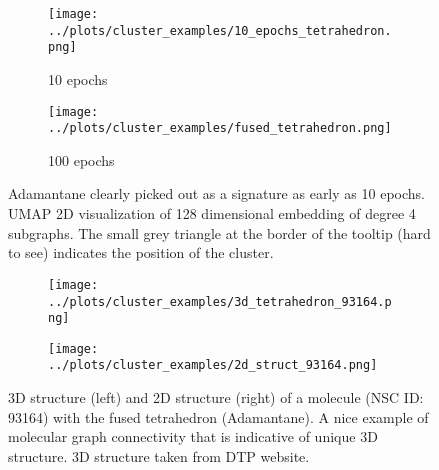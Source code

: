 \begin{figure}
\centering
\begin{subfigure}{0.45\textwidth}
    \texttt{[image: ../plots/cluster\_examples/10\_epochs\_tetrahedron.png]}
    \caption{10 epochs}
\end{subfigure}
\begin{subfigure}{0.45\textwidth}
    \texttt{[image: ../plots/cluster\_examples/fused\_tetrahedron.png]}
    \caption{100 epochs}
\end{subfigure}
\caption{Adamantane clearly picked out as a signature as early as 10 epochs. UMAP 2D visualization of 128 dimensional embedding of degree 4 subgraphs. The small grey triangle at the border of the tooltip (hard to see) indicates the position of the cluster.}
\label{fig:tetrahedron}
\end{figure}

\begin{figure}[h]
\begin{subfigure}{0.45\textwidth}
\texttt{[image: ../plots/cluster\_examples/3d\_tetrahedron\_93164.png]}
\end{subfigure}
\begin{subfigure}{0.45\textwidth}
\texttt{[image: ../plots/cluster\_examples/2d\_struct\_93164.png]}
\end{subfigure}
\caption{3D structure (left) and 2D structure (right) of a molecule (NSC ID: 93164) with the fused tetrahedron (Adamantane). A nice example of molecular graph connectivity that is indicative of unique 3D structure. 3D structure taken from DTP website.\protect\footnotemark}
\label{fig:3dguy}
\end{figure}


